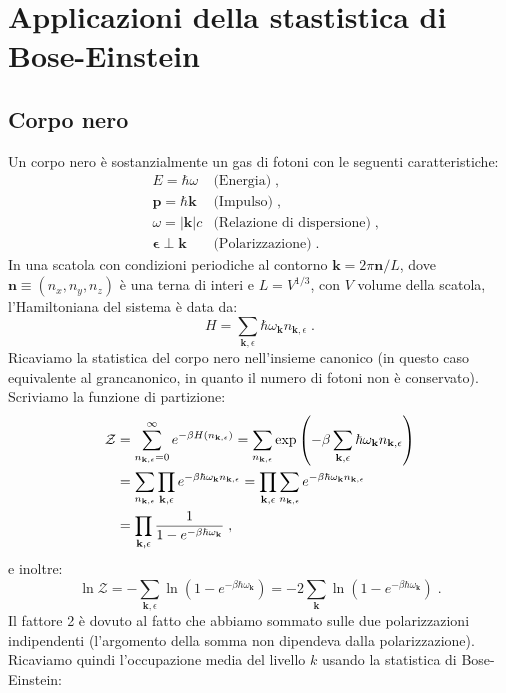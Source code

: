 \documentclass[10pt,a4paper]{report}
\theoremstyle{definition}
\numberwithin{equation}{section}
\newcommand{\zpart}{\mathcal{Z}}
\begin{document}
\chapter{Applicazioni della stastistica di Bose-Einstein}
\section{Corpo nero}
Un corpo nero è sostanzialmente un gas di fotoni con le seguenti caratteristiche:
\begin{align*}
&E=\hbar\omega &\mbox{(Energia)}\;, \\
&\mathbf{p}=\hbar\mathbf{k} &\mbox{(Impulso)}\;, \\
&\omega=|\mathbf{k}|c &\mbox{(Relazione di dispersione)}\;, \\
&\boldsymbol{\epsilon}\perp\mathbf{k} &\mbox{(Polarizzazione)}\;.
\end{align*}
In una scatola con condizioni periodiche al contorno $\mathbf{k}=2\pi\mathbf{n}/L$, dove $\mathbf{n}\equiv(n_x,n_y,n_z)$ è una terna di interi e $L=V^{1/3}$, con $V$ volume della scatola, l'Hamiltoniana del sistema è data da:
\begin{equation}
H=\sum_{\mathbf{k},\epsilon}\hbar\omega_{\mathbf{k}}n_{\mathbf{k},\epsilon}\;.
\end{equation}
Ricaviamo la statistica del corpo nero nell'insieme canonico (in questo caso equivalente al grancanonico, in quanto il numero di fotoni non è conservato). Scriviamo la funzione di partizione:
\begin{align}
\zpart &= \sum_{n_{\mathbf{k},\epsilon}=0}^{\infty}e^{-\beta H(n_{\mathbf{k},\epsilon})}=\sum_{n_{\mathbf{k},\epsilon}}\exp\left(-\beta\sum_{\mathbf{k},\epsilon}\hbar\omega_{\mathbf{k}}n_{\mathbf{k},\epsilon}\right) \notag \\
&=\sum_{n_{\mathbf{k},\epsilon}}\prod_{\mathbf{k},\epsilon}e^{-\beta\hbar\omega_{\mathbf{k}}n_{\mathbf{k},\epsilon}}=\prod_{\mathbf{k},\epsilon}\sum_{n_{\mathbf{k},\epsilon}}e^{-\beta\hbar\omega_{\mathbf{k}}n_{\mathbf{k},\epsilon}} \notag \\
&= \prod_{\mathbf{k},\epsilon}\frac{1}{1-e^{-\beta\hbar\omega_{\mathbf{k}}}}\;,
\end{align}
e inoltre:
\begin{equation}
\ln\zpart=-\sum_{\mathbf{k},\epsilon}\ln(1-e^{-\beta\hbar\omega_{\mathbf{k}}})=-2\sum_{\mathbf{k}}\ln(1-e^{-\beta\hbar\omega_{\mathbf{k}}})\;. \label{ch2_zpartfotoni}
\end{equation}
Il fattore 2 è dovuto al fatto che abbiamo sommato sulle due polarizzazioni indipendenti (l'argomento della somma non dipendeva dalla polarizzazione). Ricaviamo quindi l'occupazione media del livello $k$ usando la statistica di Bose-Einstein:
\end{document}
